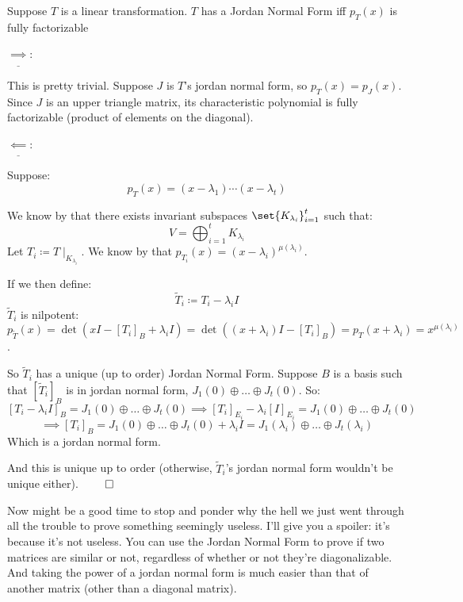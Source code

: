 \documentclass[10pt]{article}
\begin{document}
\newpage
\begin{theorem}{Suppose $T$ is a linear transformation. $T$ has a Jordan Normal Form iff $p_T(x)$ is fully factorizable}

$\underline{\implies}$: \begin{minipage}[t]{\dimexpr\textwidth-2cm}

This is pretty trivial. Suppose $J$ is $T$'s jordan normal form, so $p_T(x)=p_J(x)$. Since $J$ is an upper triangle matrix, its characteristic polynomial is fully factorizable (product of elements on the diagonal).

\end{minipage}

$\underline{\impliedby}$: \begin{minipage}[t]{\dimexpr\textwidth-2cm}

Suppose:
\[ p_T(x) = (x-\lambda_1)\cdots(x-\lambda_t) \]

We know by  that there exists invariant subspaces $\set{K_{\lambda_i}}_{i=1}^t$ such that:
\[ V = \bigoplus_{i=1}^t K_{\lambda_i} \]
Let $T_i\coloneqq T\mid_{K_{\lambda_i}}$. We know by  that $p_{T_i}(x)=(x-\lambda_i)^{\mu(\lambda_i)}$.

If we then define:
\[ \widetilde{T}_i\coloneqq T_i-\lambda_i I \]
$\widetilde{T}_i$ is nilpotent: $p_{\widetilde{T}}(x) = \det(xI-[T_i]_B+\lambda_iI) = \det((x+\lambda_i)I-[T_i]_B) = p_T(x+\lambda_i) = x^{\mu(\lambda_i)}$.

So $\widetilde{T}_i$ has a unique (up to order) Jordan Normal Form. Suppose $B$ is a basis such that $[\widetilde{T}_i]_B$ is in jordan normal form, $J_1(0)\oplus\dots\oplus J_t(0)$. So:
\[ [T_i-\lambda_iI]_B = J_1(0)\oplus\dots\oplus J_t(0) \implies [T_i]_{E_i} - \lambda_i[I]_{E_i} = J_1(0)\oplus\dots\oplus J_t(0) \]
\[ \implies [T_i]_{B} = J_1(0)\oplus\dots\oplus J_t(0) + \lambda_iI = J_1(\lambda_i)\oplus\dots\oplus J_t(\lambda_i) \]
Which is a jordan normal form.

And this is unique up to order (otherwise, $\widetilde{T}_i$'s jordan normal form wouldn't be unique either). $\qed$

\end{minipage}

\end{theorem}

Now might be a good time to stop and ponder why the hell we just went through all the trouble to prove something seemingly useless. I'll give you a spoiler: it's because it's not useless. You can use the Jordan Normal Form to prove if two matrices are similar or not, regardless of whether or not they're diagonalizable. And taking the power of a jordan normal form is much easier than that of another matrix (other than a diagonal matrix).
\end{document}
